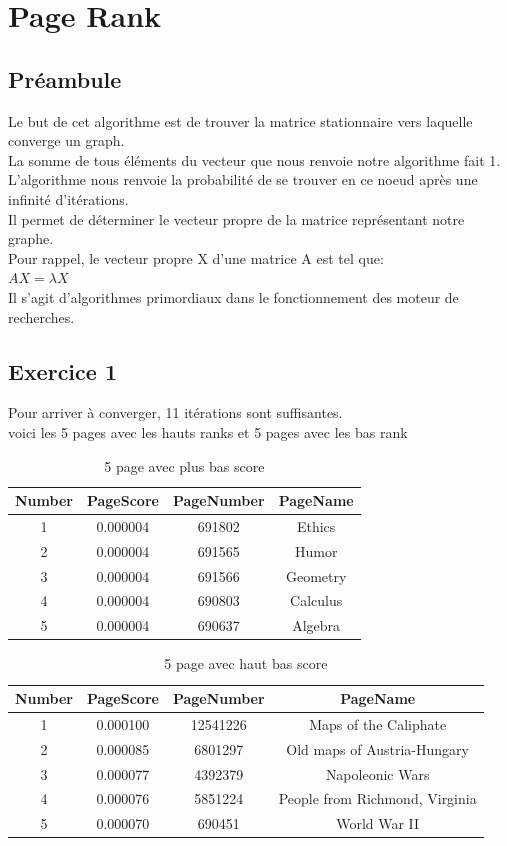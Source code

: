 \documentclass[a4paper,10pt]{report}
\begin{document}
\chapter{Page Rank}
\section{Préambule}
Le but de cet algorithme est de trouver la matrice stationnaire vers laquelle converge un graph.
\\
La somme de tous éléments du vecteur que nous renvoie notre algorithme fait 1.
\\
L'algorithme nous renvoie la probabilité de se trouver en ce noeud après une infinité d'itérations.
\\
Il permet de déterminer le vecteur propre de la matrice représentant notre graphe.
\\
Pour rappel, le vecteur propre X d'une matrice A est tel que:\\
$AX = \lambda X$
\\
Il s'agit d'algorithmes primordiaux dans le fonctionnement des moteur de recherches.
\section{Exercice 1}
Pour arriver à converger, 11 itérations sont suffisantes.
\\
voici les 5 pages avec les hauts ranks et 5 pages avec les bas rank
\begin{table}[ht]
\caption{5 page avec plus bas score}
\centering
\begin{tabular}{|c c c c|}
\hline\hline
Number & PageScore & PageNumber & PageName \\[0.5ex]
\hline
1 & 0.000004 & 691802 & Ethics \\
2 & 0.000004 & 691565 & Humor \\
3 & 0.000004 & 691566 & Geometry  \\
4 & 0.000004 & 690803 & Calculus \\
5 & 0.000004 & 690637 & Algebra \\
\hline
\end{tabular}
\label {table:nonlin}
\end{table}

\begin{table}[ht]
\caption{5 page avec haut bas score}
\centering
\begin{tabular}{|c c c c|}
\hline\hline
Number & PageScore & PageNumber & PageName \\[0.5ex]
\hline
1 & 0.000100 & 12541226 & Maps of the Caliphate \\
2 & 0.000085 & 6801297 & Old maps of Austria-Hungary \\
3 & 0.000077 & 4392379 & Napoleonic Wars  \\
4 & 0.000076 & 5851224 & People from Richmond, Virginia \\
5 & 0.000070 & 690451 & World War II \\
\hline
\end{tabular}
\end{table}
\end{document}
